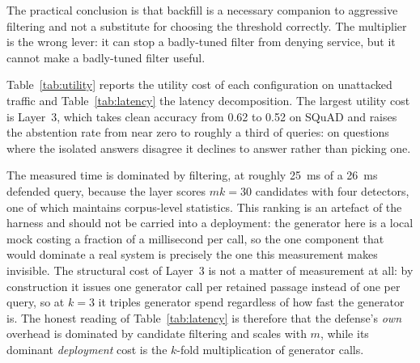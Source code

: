 \documentclass[information,article,submit,moreauthors]{Definitions/mdpi}
\newcommand{\cleanAccSquadnone}{0.62}
\newcommand{\cleanAccSquadLThree}{0.52}
\newcommand{\filterMsFullSquad}{25}
\newcommand{\meanMsFullSquad}{26}
\begin{document}
The practical conclusion is that backfill is a necessary companion to aggressive filtering and
not a substitute for choosing the threshold correctly. The multiplier is the wrong lever: it can
stop a badly-tuned filter from denying service, but it cannot make a badly-tuned filter useful.

Table~\ref{tab:utility} reports the utility cost of each configuration on unattacked traffic and
Table~\ref{tab:latency} the latency decomposition. The largest utility cost is Layer~3, which
takes clean accuracy from \cleanAccSquadnone{} to \cleanAccSquadLThree{} on SQuAD and raises the
abstention rate from near zero to roughly a third of queries: on questions where the isolated
answers disagree it declines to answer rather than picking one.

The measured time is dominated by filtering, at roughly \filterMsFullSquad{}~ms of a
\meanMsFullSquad{}~ms defended query, because the layer scores $mk = 30$ candidates with four
detectors, one of which maintains corpus-level statistics. This ranking is an artefact of the
harness and should not be carried into a deployment: the generator here is a local mock costing
a fraction of a millisecond per call, so the one component that would dominate a real system is
precisely the one this measurement makes invisible. The structural cost of Layer~3 is not a
matter of measurement at all: by construction it issues one generator call per retained
passage instead of one per query, so at $k=3$ it triples generator spend regardless of how fast
the generator is. The honest reading of Table~\ref{tab:latency} is therefore that the defense's
\emph{own} overhead is dominated by candidate filtering and scales with $m$, while its dominant
\emph{deployment} cost is the $k$-fold multiplication of generator calls.
\end{document}
